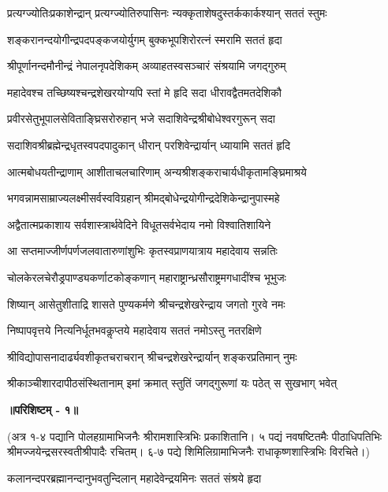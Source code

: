\twolineshloka
{प्रत्यग्ज्योतिःप्रकाशेन्द्रान् प्रत्यग्ज्योतिरुपासिनः} 
{न्यक्कृताशेषदुस्तर्ककार्कश्यान् सततं स्तुमः}%

\twolineshloka
{शङ्करानन्दयोगीन्द्रपदपङ्कजयोर्युगम्} 
{बुक्कभूपशिरोरत्नं स्मरामि सततं हृदा}%

\twolineshloka
{श्रीपूर्णानन्दमौनीन्द्रं नेपालनृपदेशिकम्} 
{अव्याहतस्वसञ्चारं संश्रयामि जगद्गुरुम्}%

\twolineshloka
{महादेवश्च तच्छिष्यश्चन्द्रशेखरयोग्यपि} 
{स्तां मे हृदि सदा धीरावद्वैतमतदेशिकौ}%

\twolineshloka
{प्रवीरसेतुभूपालसेविताङ्घ्रिसरोरुहान्} 
{भजे सदाशिवेन्द्रश्रीबोधेश्वरगुरून् सदा}%

\twolineshloka
{सदाशिवश्रीब्रह्मेन्द्रधृतस्वपदपादुकान्} 
{धीरान् परशिवेन्द्रार्यान् ध्यायामि सततं हृदि}%

\twolineshloka
{आत्मबोधयतीन्द्राणाम् आशीताचलचारिणाम्} 
{अन्यश्रीशङ्कराचार्यधीकृतामङ्घ्रिमाश्रये}%

\twolineshloka
{भगवन्नामसाम्राज्यलक्ष्मीसर्वस्वविग्रहान्} 
{श्रीमद्बोधेन्द्रयोगीन्द्रदेशिकेन्द्रानुपास्महे}%

\twolineshloka
{अद्वैतात्मप्रकाशाय सर्वशास्त्रार्थवेदिने} 
{विधूतसर्वभेदाय नमो विश्वातिशायिने}%

\twolineshloka
{आ सप्तमाज्जीर्णपर्णजलवातारुणांशुभिः} 
{कृतस्वप्राणयात्राय महादेवाय सन्नतिः}%

\twolineshloka
{चोलकेरलचेरौड्रपाण्ड्यकर्णाटकोङ्कणान्} 
{महाराष्ट्रान्ध्रसौराष्ट्रमगधादींश्च भूभुजः}%

\twolineshloka
{शिष्यान् आसेतुशीताद्रि शासते पुण्यकर्मणे} 
{श्रीचन्द्रशेखरेन्द्राय जगतो गुरवे नमः}%

\twolineshloka
{निष्पापवृत्तये नित्यनिर्धूतभवकॢप्तये} 
{महादेवाय सततं नमोऽस्तु नतरक्षिणे}%

\twolineshloka
{श्रीविद्योपासनादार्ढ्यवशीकृतचराचरान्} 
{श्रीचन्द्रशेखरेन्द्रार्यान् शङ्करप्रतिमान् नुमः}%

\twolineshloka
{श्रीकाञ्चीशारदापीठसंस्थितानाम् इमां क्रमात्} 
{स्तुतिं जगद्गुरूणां यः पठेत् स सुखभाग् भवेत्}%

\medskip

\textbf{॥परिशिष्टम् - १॥}

(अत्र १-४ पद्यानि पोलहग्रामाभिजनैः श्रीरामशास्त्रिभिः प्रकाशितानि। ५ पद्यं नवषष्टितमैः पीठाधिपतिभिः श्रीमज्जयेन्द्रसरस्वतीश्रीपादैः रचितम्। ६-७ पद्ये शिमिलिग्रामाभिजनैः राधाकृष्णशास्त्रिभिः विरचिते।)


\twolineshloka
{कलानन्दपरब्रह्मानन्दानुभवतुन्दिलान्} 
{महादेवेन्द्रयमिनः सततं संश्रये हृदा}%

